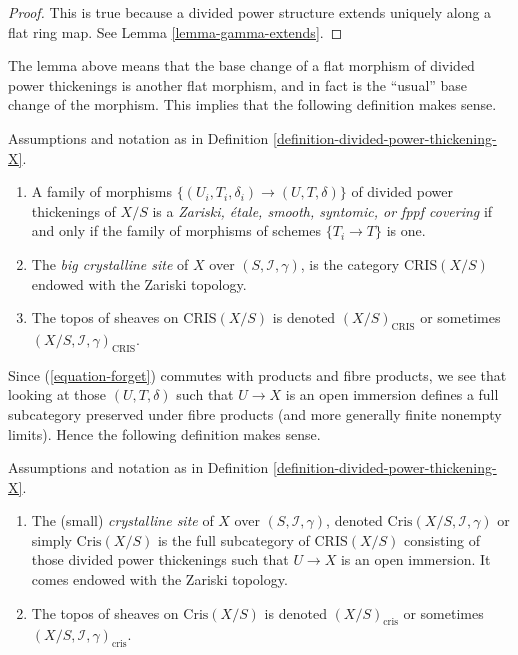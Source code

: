 \begin{proof}
This is true because a divided power structure extends uniquely
along a flat ring map. See Lemma \ref{lemma-gamma-extends}.
\end{proof}

\noindent
The lemma above means that the base change of a flat morphism
of divided power thickenings is another flat morphism, and in
fact is the ``usual'' base change of the morphism. This implies
that the following definition makes sense.

\begin{definition}
\label{definition-big-crystalline-site}
Assumptions and notation as in
Definition \ref{definition-divided-power-thickening-X}.
\begin{enumerate}
\item A family of morphisms $\{(U_i, T_i, \delta_i) \to (U, T, \delta)\}$
of divided power thickenings of $X/S$ is a {\it Zariski, \'etale, smooth,
syntomic, or fppf covering} if and only if the family of morphisms
of schemes $\{T_i \to T \}$ is one.
\item The {\it big crystalline site} of $X$ over $(S, \mathcal{I}, \gamma)$,
is the category $\text{CRIS}(X/S)$ endowed with the Zariski topology.
\item The topos of sheaves on $\text{CRIS}(X/S)$ is denoted
$(X/S)_{\text{CRIS}}$ or sometimes
$(X/S, \mathcal{I}, \gamma)_{\text{CRIS}}$.
\end{enumerate}
\end{definition}

\noindent
Since (\ref{equation-forget}) commutes with products and fibre
products, we see that looking at those $(U, T, \delta)$ such that
$U \to X$ is an open immersion defines a full
subcategory preserved under fibre products (and more generally
finite nonempty limits). Hence the following
definition makes sense.

\begin{definition}
\label{definition-crystalline-site}
Assumptions and notation as in
Definition \ref{definition-divided-power-thickening-X}.
\begin{enumerate}
\item The (small) {\it crystalline site} of $X$ over
$(S, \mathcal{I}, \gamma)$, denoted $\text{Cris}(X/S, \mathcal{I}, \gamma)$
or simply $\text{Cris}(X/S)$ is the full subcategory of $\text{CRIS}(X/S)$
consisting of those divided power thickenings such that $U \to X$ is an open
immersion. It comes endowed with the Zariski topology.
\item The topos of sheaves on $\text{Cris}(X/S)$ is denoted
$(X/S)_{\text{cris}}$ or sometimes
$(X/S, \mathcal{I}, \gamma)_{\text{cris}}$.
\end{enumerate}
\end{definition}

